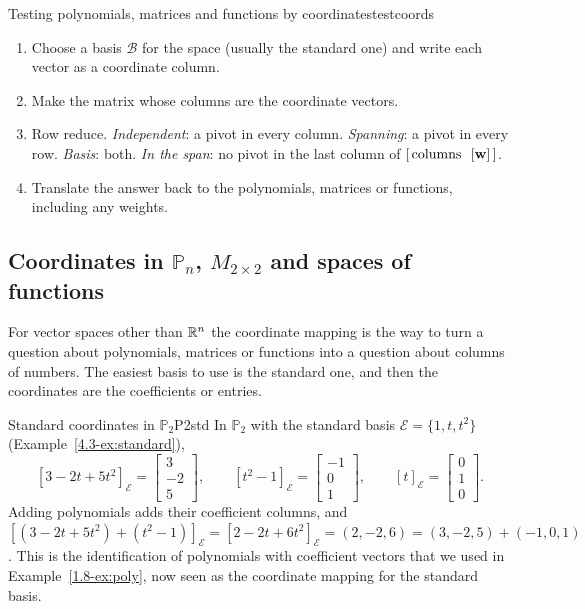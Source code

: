 \documentclass[11pt]{article}
\begin{document}
\begin{proc}{Testing polynomials, matrices and functions by coordinates}{testcoords}
\begin{enumerate}
  \item Choose a basis $\mathcal{B}$ for the space (usually the standard one) and write each vector as a coordinate column.
  \item Make the matrix whose columns are the coordinate vectors.
  \item Row reduce. \emph{Independent}: a pivot in every column. \emph{Spanning}: a pivot in every row. \emph{Basis}: both. \emph{In the span}: no pivot in the last column of $[\,\text{columns}\ \ [\mathbf{w}]\,]$.
  \item Translate the answer back to the polynomials, matrices or functions, including any weights.
\end{enumerate}
\end{proc}

\subsection*{Coordinates in $\mathbb{P}_n$, $M_{2\times2}$ and spaces of functions}

For vector spaces other than $\mathbb{R}^n$ the coordinate mapping is the way to turn a question about polynomials, matrices or functions into a question about columns of numbers. The easiest basis to use is the standard one, and then the coordinates are the coefficients or entries.

\begin{exmp}{Standard coordinates in $\mathbb{P}_2$}{P2std}
In $\mathbb{P}_2$ with the standard basis $\mathcal{E}=\{1,t,t^2\}$ (Example~\ref{4.3-ex:standard}),
\[
[3-2t+5t^2]_{\mathcal{E}}=\begin{bmatrix}3\\-2\\5\end{bmatrix},\qquad [t^2-1]_{\mathcal{E}}=\begin{bmatrix}-1\\0\\1\end{bmatrix},\qquad [t]_{\mathcal{E}}=\begin{bmatrix}0\\1\\0\end{bmatrix}.
\]
Adding polynomials adds their coefficient columns, and $[(3-2t+5t^2)+(t^2-1)]_{\mathcal{E}}=[2-2t+6t^2]_{\mathcal{E}}=(2,-2,6)=(3,-2,5)+(-1,0,1)$. This is the identification of polynomials with coefficient vectors that we used in Example~\ref{1.8-ex:poly}, now seen as the coordinate mapping for the standard basis.
\end{exmp}
\end{document}

